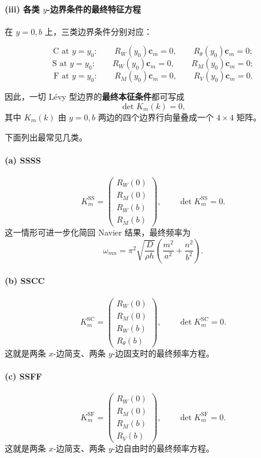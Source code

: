 \documentclass[12pt]{ctexart}
\begin{document}
\paragraph{(iii) 各类 \(y\)-边界条件的最终特征方程}
在 \(y=0,b\) 上，三类边界条件分别对应：

\[
\text{C at } y=y_0:\qquad
R_W(y_0)\bm c_m=0,\qquad
R_\theta(y_0)\bm c_m=0;
\]
\[
\text{S at } y=y_0:\qquad
R_W(y_0)\bm c_m=0,\qquad
R_M(y_0)\bm c_m=0;
\]
\[
\text{F at } y=y_0:\qquad
R_M(y_0)\bm c_m=0,\qquad
R_V(y_0)\bm c_m=0.
\]

因此，一切 L\'evy 型边界的\textbf{最终本征条件}都可写成
\[
\det K_m(k)=0,
\]
其中 \(K_m(k)\) 由 \(y=0,b\) 两边的四个边界行向量叠成一个 \(4\times4\) 矩阵。

下面列出最常见几类。

\paragraph{(a) SSSS}
\[
K_m^{\text{SS}}
=
\begin{pmatrix}
R_W(0)\\
R_M(0)\\
R_W(b)\\
R_M(b)
\end{pmatrix},
\qquad
\det K_m^{\text{SS}}=0.
\]
这一情形可进一步化简回 Navier 结果，最终频率为
\[
\omega_{mn}
=
\pi^2\sqrt{\frac{D}{\rho h}}
\left(
\frac{m^2}{a^2}+\frac{n^2}{b^2}
\right).
\]

\paragraph{(b) SSCC}
\[
K_m^{\text{SC}}
=
\begin{pmatrix}
R_W(0)\\
R_M(0)\\
R_W(b)\\
R_\theta(b)
\end{pmatrix},
\qquad
\det K_m^{\text{SC}}=0.
\]
这就是两条 \(x\)-边简支、两条 \(y\)-边固支时的最终频率方程。

\paragraph{(c) SSFF}
\[
K_m^{\text{SF}}
=
\begin{pmatrix}
R_W(0)\\
R_M(0)\\
R_M(b)\\
R_V(b)
\end{pmatrix},
\qquad
\det K_m^{\text{SF}}=0.
\]
这就是两条 \(x\)-边简支、两条 \(y\)-边自由时的最终频率方程。
\end{document}
